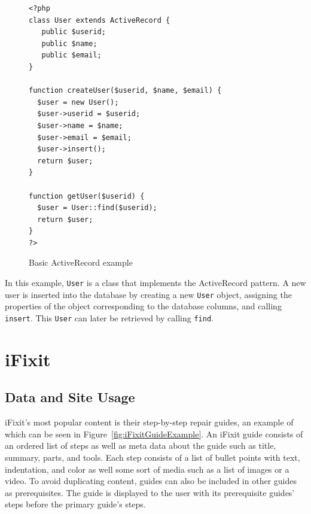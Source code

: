 \documentclass[12pt]{ucthesis}
\begin{document}
\begin{figure}[h]
\begin{ssp}
\begin{verbatim}
<?php
class User extends ActiveRecord {
   public $userid;
   public $name;
   public $email;
}

function createUser($userid, $name, $email) {
  $user = new User();
  $user->userid = $userid;
  $user->name = $name;
  $user->email = $email;
  $user->insert();
  return $user;
}

function getUser($userid) {
  $user = User::find($userid);
  return $user;
}
?>
\end{verbatim}
\caption{Basic ActiveRecord example}
\label{fig:activeRecordExample}
\end{ssp}
\end{figure}

In this example, {\tt User} is a class that implements the ActiveRecord pattern.
A new user is inserted into the database by creating a new {\tt User} object, assigning the properties of the object corresponding to the database columns, and calling {\tt insert}.
This {\tt User} can later be retrieved by calling {\tt find}.


\section{iFixit}

\subsection{Data and Site Usage}
\textsf{iFixit}'s most popular content is their step-by-step repair guides, an example of which can be seen in Figure~\ref{fig:iFixitGuideExample}.
An \textsf{iFixit} guide consists of an ordered list of steps as well as meta data about the guide such as title, summary, parts, and tools.
Each step consists of a list of bullet points with text, indentation, and color as well some sort of media such as a list of images or a video.
To avoid duplicating content, guides can also be included in other guides as prerequisites.
The guide is displayed to the user with its prerequisite guides' steps before the primary guide's steps.
\end{document}
